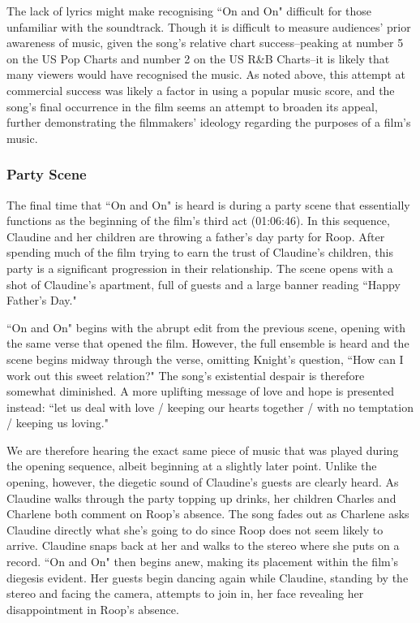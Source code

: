 The lack of lyrics might make recognising ``On and On" difficult for those unfamiliar with the soundtrack.
Though it is difficult to measure audiences' prior awareness of music, given the song's relative chart success–peaking at number 5 on the US Pop Charts and number 2 on the US R\&B Charts–it is likely that many viewers would have recognised the music.
As noted above, this attempt at commercial success was likely a factor in using a popular music score, and the song's final occurrence in the film seems an attempt to broaden its appeal, further demonstrating the filmmakers' ideology regarding the purposes of a film's music.



\subsubsection{Party Scene}

The final time that ``On and On" is heard is during a party scene that essentially functions as the beginning of the film's third act (01:06:46).
In this sequence, Claudine and her children are throwing a father's day party for Roop.
After spending much of the film trying to earn the trust of Claudine's children, this party is a significant progression in their relationship.
The scene opens with a shot of Claudine's apartment, full of guests and a large banner reading ``Happy Father's Day."

``On and On" begins with the abrupt edit from the previous scene, opening with the same verse that opened the film.
However, the full ensemble is heard and the scene begins midway through the verse, omitting Knight's question, ``How can I work out this sweet relation?"
The song's existential despair is therefore somewhat diminished.
A more uplifting message of love and hope is presented instead: ``let us deal with love / keeping our hearts together / with no temptation / keeping us loving."

We are therefore hearing the exact same piece of music that was played during the opening sequence, albeit beginning at a slightly later point.
Unlike the opening, however, the diegetic sound of Claudine's guests are clearly heard.
As Claudine walks through the party topping up drinks, her children Charles and Charlene both comment on Roop's absence.
The song fades out as Charlene asks Claudine directly what she's going to do since Roop does not seem likely to arrive.
Claudine snaps back at her and walks to the stereo where she puts on a record.
``On and On" then begins anew, making its placement within the film's diegesis evident.
Her guests begin dancing again while Claudine, standing by the stereo and facing the camera, attempts to join in, her face revealing her disappointment in Roop's absence. 


